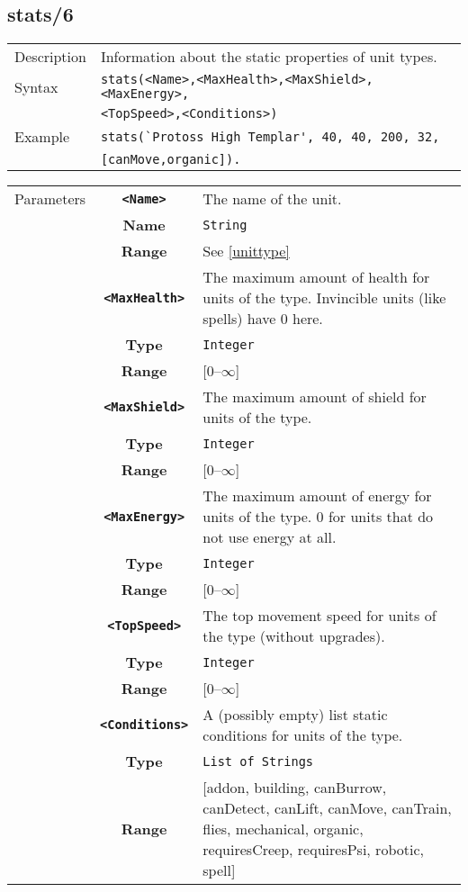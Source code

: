 \subsection{stats/6}
\begin{tabularx}{\textwidth}{lX}
 Description & Information about the static properties of unit types. \\
 Syntax & \verb|stats(<Name>,<MaxHealth>,<MaxShield>,<MaxEnergy>,| \\ & \quad \verb|<TopSpeed>,<Conditions>)| \\
 Example & \verb|stats(`Protoss High Templar', 40, 40, 200, 32,| \\ & \quad \verb|[canMove,organic]).| \\
 \end{tabularx}
 \begin{tabularx}{\textwidth}{l | c | p{8cm}|}
 \cline{2-3}
 Parameters & \textbf{\verb|<Name>|} & The name of the unit. \\
            & \textbf{Name} & \verb|String| \\
            & \textbf{Range} & See \ref{unittype} \\
            \cline{2-3}
            & \textbf{\verb|<MaxHealth>|} & The maximum amount of health for units of the type. Invincible units (like spells) have 0 here. \\
            & \textbf{Type} & \verb|Integer| \\
            & \textbf{Range} & [0--$\infty$] \\
            \cline{2-3}
            & \textbf{\verb|<MaxShield>|} & The maximum amount of shield for units of the type. \\
            & \textbf{Type} & \verb|Integer| \\
            & \textbf{Range} & [0--$\infty$] \\
            \cline{2-3}
            & \textbf{\verb|<MaxEnergy>|} & The maximum amount of energy for units of the type. 0 for units that do not use energy at all. \\
            & \textbf{Type} & \verb|Integer| \\
            & \textbf{Range} & [0--$\infty$] \\
            \cline{2-3}
            & \textbf{\verb|<TopSpeed>|} & The top movement speed for units of the type (without upgrades).\\
            & \textbf{Type} & \verb|Integer| \\
            & \textbf{Range} & [0--$\infty$] \\
            \cline{2-3}
            & \textbf{\verb|<Conditions>|} & A (possibly empty) list static conditions for units of the type. \\
            & \textbf{Type} & \verb|List of Strings| \\
            & \textbf{Range} & [addon, building, canBurrow, canDetect, canLift, canMove, canTrain, flies, mechanical, organic, requiresCreep, requiresPsi, robotic, spell] \\
            \cline{2-3}
\end{tabularx}

